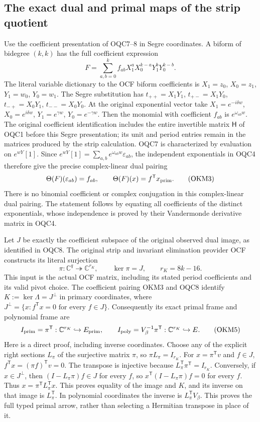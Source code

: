 \documentclass[11pt,a4paper]{article}
\begin{document}
\subsection{The exact dual and primal maps of the strip quotient}
Use the coefficient presentation of OQC7--8 in Segre coordinates.
A biform of bidegree $(k,k)$ has the full coefficient expression
\[
 F=\sum_{a,b=0}^k f_{ab}
       X_1^aX_0^{k-a}Y_1^bY_0^{k-b}.
 \tag{OKM2}
\]
The literal variable dictionary to the OCF biform coefficients is
$X_1=z_0$, $X_0=z_1$, $Y_1=w_0$, $Y_0=w_1$.
The Segre substitution has
$t_{++}=X_1Y_1$, $t_{+-}=X_1Y_0$,
$t_{-+}=X_0Y_1$, $t_{--}=X_0Y_0$.
At the original exponential vector take
$X_1=e^{-i\delta w}$, $X_0=e^{i\delta w}$,
$Y_1=e^{\gamma w}$, $Y_0=e^{-\gamma w}$.
Then the monomial with coefficient $f_{ab}$ is $e^{\omega_{ab}w}$.
The original coefficient identification includes the entire invertible
matrix $\mathsf H$ of OQC1 before this Segre presentation; its unit
and period entries remain in the matrices produced by the strip
calculation. OQC7 is characterized by evaluation on $e^{wY}[1]$.
Since
$e^{wY}[1]=\sum_{a,b}e^{\omega_{ab}w}\varepsilon_{ab}$,
the independent exponentials in OQC4 therefore give the precise
complex-linear dual pairing
\[
 \Theta(F)(\varepsilon_{ab})=f_{ab},\qquad
 \Theta(F)(x)=f^{\mathsf T}x_{\rm prim}.
 \tag{OKM3}
\]
There is no binomial coefficient or complex conjugation in this
complex-linear dual pairing. The statement follows by equating all
coefficients of the distinct exponentials, whose independence is
proved by their Vandermonde derivative matrix in OQC4.

Let $J$ be exactly the coefficient subspace of the original observed
dual image, as identified in OQC8. The original strip and invariant
elimination provider OCF constructs its literal surjection
\[
 \pi:\mathbb C^q\twoheadrightarrow\mathbb C^{r_K},
 \qquad\ker\pi=J,\qquad r_K=8k-16.
 \tag{OKM4}
\]
This input is the actual OCF matrix, including its stated period
coefficients and its valid pivot choice. The coefficient pairing
OKM3 and OQC8 identify
$K:=\ker\Lambda=J^\perp$ in primary coordinates, where
$J^\perp=\{x:f^{\mathsf T}x=0\text{ for every }f\in J\}$.
Consequently its exact primal frame and polynomial frame are
\[
 I_{\rm prim}=\pi^{\mathsf T}:\mathbb C^{r_K}\hookrightarrow E_{\rm prim},
 \qquad I_{\rm poly}=V_\beta^{-1}\pi^{\mathsf T}:
                        \mathbb C^{r_K}\hookrightarrow E.
 \tag{OKM5}
\]
Here is a direct proof, including inverse coordinates. Choose any of
the explicit right sections $L_\pi$ of the surjective matrix $\pi$,
so $\pi L_\pi=I_{r_K}$. For $x=\pi^{\mathsf T}v$ and $f\in J$,
$f^{\mathsf T}x=(\pi f)^{\mathsf T}v=0$. The transpose is
injective because $L_\pi^{\mathsf T}\pi^{\mathsf T}=I_{r_K}$.
Conversely, if $x\in J^\perp$, then
$(I-L_\pi\pi)f\in J$ for every $f$, so
$x^{\mathsf T}(I-L_\pi\pi)f=0$ for every $f$. Thus
$x=\pi^{\mathsf T}L_\pi^{\mathsf T}x$.
This proves equality of the image and $K$, and its inverse on that
image is $L_\pi^{\mathsf T}$. In polynomial coordinates the inverse
is $L_\pi^{\mathsf T}V_\beta$. This proves the full typed primal
arrow, rather than selecting a Hermitian transpose in place of it.
\end{document}
